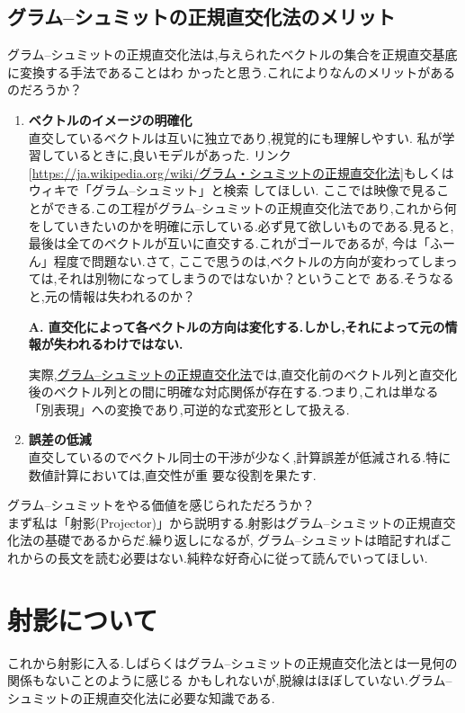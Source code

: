\subsection{グラム--シュミットの正規直交化法のメリット}
グラム--シュミットの正規直交化法は,与えられたベクトルの集合を正規直交基底に変換する手法であることはわ
かったと思う.これによりなんのメリットがあるのだろうか？
\begin{enumerate}
    \item \textbf{ベクトルのイメージの明確化}\\
    直交しているベクトルは互いに独立であり,視覚的にも理解しやすい.
    私が学習しているときに,良いモデルがあった.
    \hypertarget{wiki}{}
    リンク[\url{https://ja.wikipedia.org/wiki/グラム・シュミットの正規直交化法}]もしくはウィキで「グラム--シュミット」と検索
    してほしい. ここでは映像で見ることができる.この工程がグラム--シュミットの正規直交化法であり,これから何
    をしていきたいのかを明確に示している.必ず見て欲しいものである.見ると,最後は全てのベクトルが互いに直交する.これがゴールであるが,
    今は「ふーん」程度で問題ない.さて,
    ここで思うのは,ベクトルの方向が変わってしまっては,それは別物になってしまうのではないか？ということで
    ある.そうなると,元の情報は失われるのか？
    \begin{center}
        \textbf{A. 直交化によって各ベクトルの方向は変化する.しかし,それによって元の情報が失われるわけではない.}
    \end{center}
 実際,\hyperlink{Gram}{グラム–シュミットの正規直交化法}では,直交化前のベクトル列と直交化後のベクトル列との間に明確な対応関係が存在する.つまり,これは単なる「別表現」への変換であり,可逆的な式変形として扱える.
    \item \textbf{誤差の低減}\\
    直交しているのでベクトル同士の干渉が少なく,計算誤差が低減される.特に数値計算においては,直交性が重
    要な役割を果たす.
\end{enumerate}
\vspace{1cm}
\hspace{1em}
グラム--シュミットをやる価値を感じられただろうか？\\
まず私は「射影(Projector)」から説明する.射影はグラム--シュミットの正規直交化法の基礎であるからだ.繰り返しになるが,
グラム--シュミットは暗記すればこれからの長文を読む必要はない.純粋な好奇心に従って読んでいってほしい.
\section{射影について}
これから射影に入る.しばらくはグラム--シュミットの正規直交化法とは一見何の関係もないことのように感じる
かもしれないが,脱線はほぼしていない.グラム--シュミットの正規直交化法に必要な知識である.
